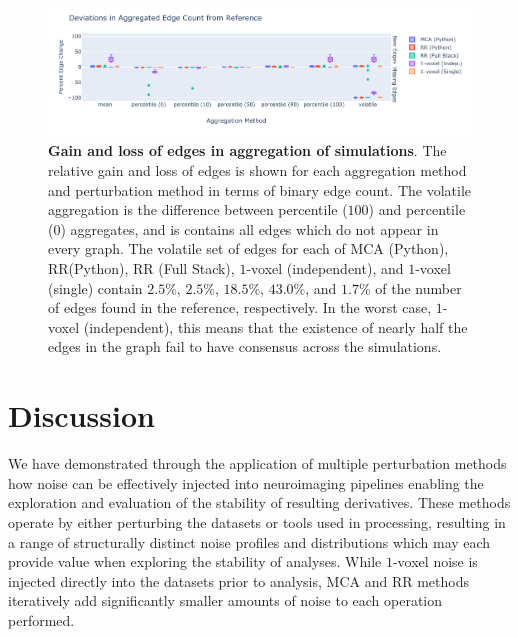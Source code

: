 \documentclass[fleqn,12pt]{SelfArx_ch} %
\begin{document}
\begin{figure}[bth]
    \centerline{\includegraphics[width=1.1\linewidth]{figures/fig5_aggregation_methods.pdf}}
    \caption{\textbf{Gain and loss of edges in aggregation of simulations}.
    The relative gain and loss of edges is shown for each aggregation method and
    perturbation method in terms of binary edge count. The volatile aggregation
    is the difference between percentile ($100$) and percentile ($0$) aggregates,
    and is contains all edges which do not appear in every graph. The volatile
    set of edges for each of MCA (Python), RR(Python), RR (Full Stack),
    $1$-voxel (independent), and $1$-voxel (single) contain $2.5 \%$, $2.5 \%$,
    $18.5 \%$, $43.0 \%$, and $1.7 \%$ of the number of edges found in the
    reference, respectively. In the worst case, $1$-voxel (independent), this
    means that the existence of nearly half the edges in the graph fail to have
    consensus across the simulations.}
    \label{fig5:aggregation_methods}
\end{figure}

\section{Discussion}
We have demonstrated through the application of multiple perturbation methods how noise can be effectively injected
into neuroimaging pipelines enabling the exploration and evaluation of the stability of resulting derivatives. These
methods operate by either perturbing the datasets or tools used in processing, resulting in a range of structurally
distinct noise profiles and distributions which may each provide value when exploring the stability of analyses. While
$1$-voxel noise is injected directly into the datasets prior to analysis, MCA and RR methods iteratively add
significantly smaller amounts of noise to each operation performed.
\end{document}
